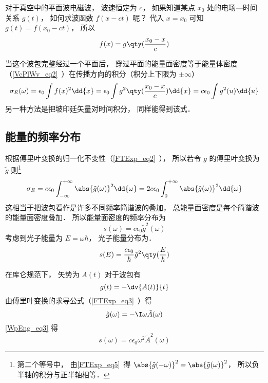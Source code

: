 

对于真空中的平面波电磁波， 波速恒定为 $c$， 如果知道某点 $x_0$ 处的电场—时间关系 $g(t)$， 如何求波函数 $f(x - ct)$ 呢？ 代入 $x = x_0$ 可知 $g(t) = f(x_0 - ct)$， 所以
\begin{equation}
f(x) = g\qty(\frac{x_0 - x}{c})
\end{equation}

当这个波包完整经过一个平面后， 穿过平面的能量面密度等于能量体密度（\autoref{VcPlWv_eq2}~）在传播方向的积分（积分上下限为 $\pm\infty$）
\begin{equation}\label{WpEng_eq1}
\sigma_E(\omega) = \epsilon_0 \int f(x)^2 \dd{x} = \epsilon_0  \int g^2\qty(\frac{x_0 - x}{c}) \dd{x} = c\epsilon_0 \int g^2(u) \dd{u}
\end{equation}
另一种方法是把坡印廷矢量对时间积分， 同样能得到该式．

\subsection{能量的频率分布}
根据傅里叶变换的归一化不变性（\autoref{FTExp_eq2}~）， 所以若令 $g$ 的傅里叶变换为 $\tilde g$ 则\footnote{第二个等号中， 由\autoref{FTExp_eq5}~得 $\abs{\tilde g(-\omega)}^2 = \abs{\tilde g(\omega)}^2$， 所以负半轴的积分与正半轴相等．}
\begin{equation}
\sigma_E = c\epsilon_0 \int_{-\infty}^{+\infty} \abs{\tilde g(\omega)}^2 \dd{\omega} = 2c\epsilon_0 \int_{0}^{+\infty} \abs{\tilde g(\omega)}^2 \dd{\omega}
\end{equation}
这相当于把波包看作是许多不同频率简谐波的叠加， 总能量面密度是每个简谐波的能量面密度叠加． 所以能量面密度的频率分布为
\begin{equation}\label{WpEng_eq3}
s(\omega) = c\epsilon_0 {\tilde g}^2(\omega)
\end{equation}
考虑到光子能量为 $E = \omega\hbar$， 光子能量分布为．
\begin{equation}\label{WpEng_eq2}
s(E) = \frac{c\epsilon_0}{\hbar} {\tilde g}^2\qty(\frac{E}{\hbar})
\end{equation}

在库仑规范下， 矢势为 $A(t)$ 对于波包有
\begin{equation}
g(t) = -\dv{A(t)}{t}
\end{equation}
由傅里叶变换的求导公式（\autoref{FTExp_eq3}~）得
\begin{equation}
\tilde g(\omega) = -\I \omega \tilde A(\omega)
\end{equation}
\autoref{WpEng_eq3} 得
\begin{equation}
s(\omega) = c\epsilon_0 \omega^2 {\tilde A}^2(\omega)
\end{equation}
